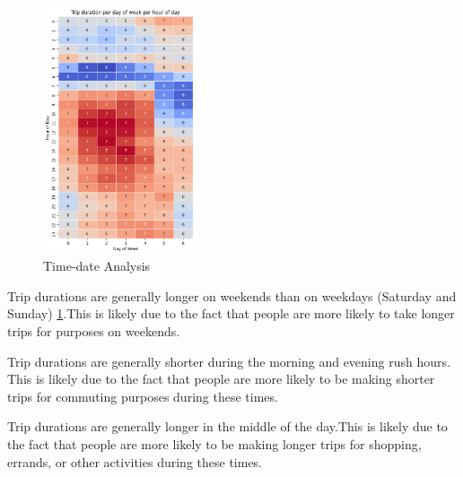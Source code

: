 \documentclass[twocolumn, 9pt]{extarticle}
\begin{document}
\begin{figure}[ht]
\centering
    \includegraphics[width=0.4\textwidth, height=0.5\textheight]{weeks.png}
    \caption{\label{fig:time2} Time-date Analysis}
\end{figure}

\hfill \break
Trip durations are generally longer on weekends than on weekdays (Saturday and Sunday) \ref{fig:time2}.This is likely due to the fact that people are more likely to take longer trips for purposes on weekends.

\hfill \break
Trip durations are generally shorter during the morning and evening rush hours. This is likely due to the fact that people are more likely to be making shorter trips for commuting purposes during these times.

\hfill \break
Trip durations are generally longer in the middle of the day.This is likely due to the fact that people are more likely to be making longer trips for shopping, errands, or other activities during these times.


\newpage

\newpage

\end{document}
